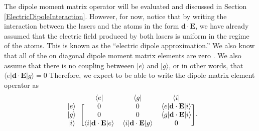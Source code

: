 The dipole moment matrix operator will be evaluated and discussed in Section\,\ref{ElectricDipoleInteraction}. However, for now, notice that by writing the interaction between the lasers and the atoms in the form $\mathbf{d}\cdot\mathbf{E}$, we have already assumed that the electric field produced by both lasers is uniform in the regime of the atoms. This is known as the ``electric dipole approximation.'' We also know that all of the on diagonal dipole moment matrix elements are zero \cite{cohenTannoudji}. We also assume that there is no coupling betweeen $|e\rangle$ and $|g\rangle$, or in other words, that $\langle e|\mathbf{d}\cdot\mathbf{E}|g\rangle=0$ Therefore, we expect to be able to write the dipole matrix element operator as 
\begin{equation}
\label{VSchrod}
\begin{blockarray}{cccc}
&\langle e| & \langle g| & \langle i|\\
\begin{block}{c[ccc]}
|e\rangle & 0 & 0 & \langle e |\mathbf{d}\cdot\mathbf{E}|i\rangle \\
|g\rangle & 0 & 0 & \langle g |\mathbf{d}\cdot\mathbf{E}|i\rangle\\
|i\rangle & \langle i |\mathbf{d}\cdot\mathbf{E}|e\rangle & \langle i |\mathbf{d}\cdot\mathbf{E}|g\rangle& 0 \\
\end{block} 
\end{blockarray}.
\end{equation}


